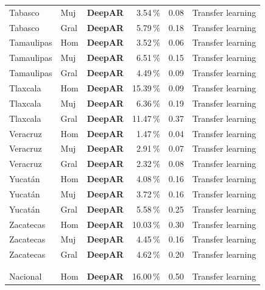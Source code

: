 \documentclass[12pt, letterpaper]{article}
\begin{document}
\begin{longtable}{l l >{\bfseries}c r r l}
Tabasco & Muj & \textcolor{cdeepar}{\textbf{DeepAR}} & 3.54\,\% & 0.08 & Transfer learning \\
Tabasco & Gral & \textcolor{cdeepar}{\textbf{DeepAR}} & 5.79\,\% & 0.18 & Transfer learning \\
Tamaulipas & Hom & \textcolor{cdeepar}{\textbf{DeepAR}} & 3.52\,\% & 0.06 & Transfer learning \\
Tamaulipas & Muj & \textcolor{cdeepar}{\textbf{DeepAR}} & 6.51\,\% & 0.15 & Transfer learning \\
Tamaulipas & Gral & \textcolor{cdeepar}{\textbf{DeepAR}} & 4.49\,\% & 0.09 & Transfer learning \\
Tlaxcala & Hom & \textcolor{cdeepar}{\textbf{DeepAR}} & 15.39\,\% & 0.09 & Transfer learning \\
Tlaxcala & Muj & \textcolor{cdeepar}{\textbf{DeepAR}} & 6.36\,\% & 0.19 & Transfer learning \\
Tlaxcala & Gral & \textcolor{cdeepar}{\textbf{DeepAR}} & 11.47\,\% & 0.37 & Transfer learning \\
Veracruz & Hom & \textcolor{cdeepar}{\textbf{DeepAR}} & 1.47\,\% & 0.04 & Transfer learning \\
Veracruz & Muj & \textcolor{cdeepar}{\textbf{DeepAR}} & 2.91\,\% & 0.07 & Transfer learning \\
Veracruz & Gral & \textcolor{cdeepar}{\textbf{DeepAR}} & 2.32\,\% & 0.08 & Transfer learning \\
Yucatán & Hom & \textcolor{cdeepar}{\textbf{DeepAR}} & 4.08\,\% & 0.16 & Transfer learning \\
Yucatán & Muj & \textcolor{cdeepar}{\textbf{DeepAR}} & 3.72\,\% & 0.16 & Transfer learning \\
Yucatán & Gral & \textcolor{cdeepar}{\textbf{DeepAR}} & 5.58\,\% & 0.25 & Transfer learning \\
Zacatecas & Hom & \textcolor{cdeepar}{\textbf{DeepAR}} & 10.03\,\% & 0.30 & Transfer learning \\
Zacatecas & Muj & \textcolor{cdeepar}{\textbf{DeepAR}} & 4.45\,\% & 0.16 & Transfer learning \\
Zacatecas & Gral & \textcolor{cdeepar}{\textbf{DeepAR}} & 4.62\,\% & 0.20 & Transfer learning \\
\midrule
\rowcolor{cream!50} \multicolumn{6}{c}{\textbf{Parkinson (G20)}} \\
\midrule
\rowcolor{lightgreen!15} \multicolumn{6}{l}{\textit{\small Nivel Nacional}} \\
Nacional & Hom & \textcolor{cdeepar}{\textbf{DeepAR}} & 16.00\,\% & 0.50 & Transfer learning \\

\end{longtable}
\end{document}
